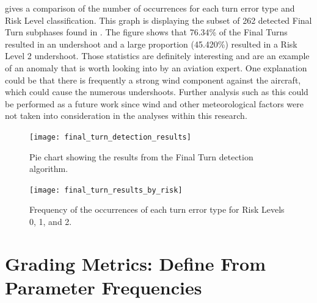              gives a comparison of the number of occurrences for each turn error type and Risk Level classification.  This graph is displaying the subset of 262 detected Final Turn subphases found in .  The figure shows that 76.34\% of the Final Turns resulted in an undershoot and a large proportion (45.420\%) resulted in a Risk Level 2 undershoot.  Those statistics are definitely interesting and are an example of an anomaly that is worth looking into by an aviation expert.  One explanation could be that there is frequently a strong wind component against the aircraft, which could cause the numerous undershoots.  Further analysis such as this could be performed as a future work since wind and other meteorological factors were not taken into consideration in the analyses within this research.
            
            \begin{figure}
            	\centering
                \texttt{[image: final\_turn\_detection\_results]}
                \caption{Pie chart showing the results from the Final Turn detection algorithm.}
                \label{fig:final_turn_results_ratios}
            \end{figure}
            
            \begin{figure}
            	\centering
                \texttt{[image: final\_turn\_results\_by\_risk]}
                \caption{Frequency of the occurrences of each turn error type for Risk Levels 0, 1, and 2.}
                \label{fig:final_turn_results_by_risk}
            \end{figure}
            
        
        


\section{Grading Metrics:  Define From Parameter Frequencies}

